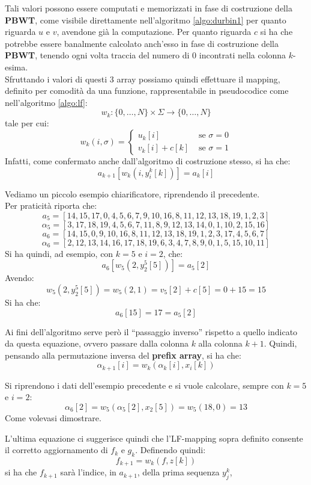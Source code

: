 Tali valori possono essere computati e memorizzati in fase di costruzione della
\textbf{PBWT}, come visibile direttamente nell'algoritmo \ref{algo:durbin1} per
quanto riguarda $u$ e $v$, avendone già la computazione. Per quanto riguarda $c$
si ha che potrebbe essere banalmente calcolato anch'esso in fase di costruzione
della \textbf{PBWT}, tenendo ogni volta traccia del numero di 0 incontrati
nella colonna $k$-esima.\\
Sfruttando i valori di questi 3 array possiamo quindi effettuare il mapping,
definito per comodità da una funzione, rappresentabile in pseudocodice come
nell'algoritmo \ref{algo:lf}:
\[w_k:\{0,\ldots,N\}\times\Sigma\to \{0,\ldots,N\}\]
tale per cui:
\[w_k(i,\sigma)=
  \begin{cases}
    u_k[i]&\mbox{ se }\sigma=0\\
    v_k[i]+c[k]&\mbox{ se }\sigma=1
  \end{cases}
\]
Infatti, come confermato anche dall'algoritmo di costruzione stesso, si ha che:
\[a_{k+1}\left[w_k\left(i,y_i^k[k]\right)\right]=a_k[i]\]
\begin{esempio}
  Vediamo un piccolo esempio chiarificatore, riprendendo il precedente.\\
  Per praticità riporta che:
  \[a_5=[14,15,17,0,4,5,6,7,9,10,16,8,11,12,13,18,19,1,2,3]\]
  \[\alpha_5=[3,17,18,19,4,5,6,7,11,8,9,12,13,14,0,1,10,2,15,16]\]
  \[a_6=[14,15,0,9,10,16,8,11,12,13,18,19,1,2,3,17,4,5,6,7]\]
  \[\alpha_6=[2,12,13,14,16,17,18,19,6,3,4,7,8,9,0,1,5,15,10,11]\]
  Si ha quindi, ad esempio, con $k=5$ e $i=2$, che:
  \[a_{6}\left[w_5\left(2,y_2^5[5]\right)\right]=a_5[2]\]
  Avendo:
  \[w_5\left(2,y_2^5[5]\right)=w_5\left(2,1\right)=v_5[2]+c[5]=0+15=15\]
  Si ha che:
  \[a_{6}[15]=17=a_5[2]\]
\end{esempio}
Ai fini dell'algoritmo serve però il ``passaggio inverso'' rispetto a quello
indicato da questa equazione, ovvero passare dalla colonna $k$ alla colonna
$k+1$. Quindi, pensando alla permutazione inversa del \textbf{prefix array}, si
ha che:
\[\alpha_{k+1}[i]=w_k(\alpha_k[i],x_i[k])\]
\begin{esempio}
  Si riprendono i dati dell'esempio precedente e si vuole calcolare, sempre con
  $k=5$ e $i=2$:
  \[\alpha_{6}[2]=w_5(\alpha_5[2],x_2[5])=w_5(18,0)=13\]
  Come volevasi dimostrare.
\end{esempio}
L'ultima equazione ci suggerisce quindi che l'LF-mapping sopra definito
consente il corretto aggiornamento di $f_k$ e $g_k$.
Definendo quindi:
\[f_{k+1}=w_k(f,z[k])\]
si ha che $f_{k+1}$ sarà l'indice, in $a_{k+1}$, della prima sequenza $y_j^k$,
